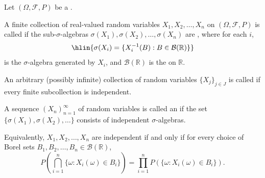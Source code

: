 \begin{definition} \label{definition:independence_of_random_variables_on_a_probability_measure_space}
Let $(\Omega, \mathcal{F}, P)$ be a .

A finite collection of real-valued random variables $X_1, X_2, \dots, X_n$ on $(\Omega, \mathcal{F}, P)$ is called  if the sub-$\sigma$-algebras $\sigma(X_1), \sigma(X_2), \dots, \sigma(X_n)$ are , where for each $i$,
$$\hlin{\sigma(X_i) = \{X_i^{-1}(B) : B \in \mathcal{B}(\mathbb{R})\}}$$
is the $\sigma$-algebra generated by $X_i$, and $\mathcal{B}(\mathbb{R})$ is the  on $\mathbb{R}$.

An arbitrary (possibly infinite) collection of random variables $\{X_j\}_{j \in J}$ is called  if every finite subcollection is independent.

A sequence $(X_n)_{n=1}^\infty$ of random variables is called an  if the set $\{\sigma(X_1), \sigma(X_2), \dots\}$ consists of independent $\sigma$-algebras.

Equivalently, $X_1, X_2, \dots, X_n$ are independent if and only if for every choice of Borel sets $B_1, B_2, \dots, B_n \in \mathcal{B}(\mathbb{R})$,
$$P\left(\bigcap_{i=1}^n \{\omega : X_i(\omega) \in B_i\}\right) = \prod_{i=1}^n P(\{\omega : X_i(\omega) \in B_i\}).$$
\end{definition}